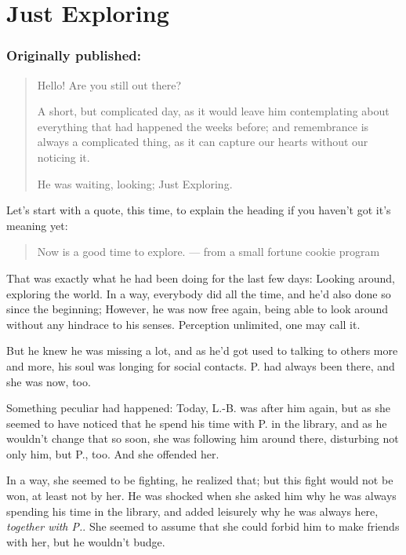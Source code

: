 \chapter{Just Exploring}
\label{cha:just-exploring}
\subsection*{Originally published: }
\begin{quote}
Hello! Are you still out there?

A short, but complicated day, as it would leave him contemplating about everything that had happened the weeks before; and remembrance is always a complicated thing, as it can capture our hearts without our noticing it.

He was waiting, looking; Just Exploring.
\end{quote}

Let's start with a quote, this time, to explain the heading if you haven't got it's meaning yet: 
\begin{quote}
  Now is a good time to explore.
  --- from a small fortune cookie program
\end{quote}
That was exactly what he had been doing for the last few days: Looking around, exploring the world. In a way, everybody did all the time, and he'd also done so since the beginning; However, he was now free again, being able to look around without any hindrace to his senses. 
Perception unlimited, one may call it.

But he knew he was missing a lot, and as he'd got used to talking to others more and more, his soul was longing for social contacts. 
P. had always been there, and she was now, too.

Something peculiar had happened: Today, L.-B. was after him again, but as she seemed to have noticed that he spend his time with P. in the library, and as he wouldn't change that so soon, she was following him around there, disturbing not only him, but P., too. 
And she offended her.

In a way, she seemed to be fighting, he realized that; but this fight would not be won, at least not by her. 
He was shocked when she asked him why he was always spending his time in the library, and added leisurely why he was always here, \emph{together with P.}. She seemed to assume that she could forbid him to make friends with her, but he wouldn't budge.

